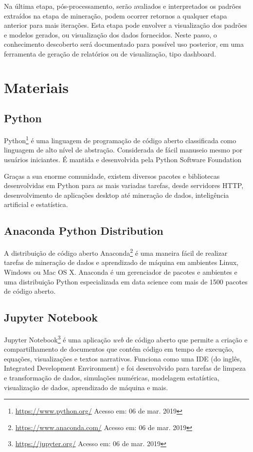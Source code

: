 Na última etapa, pós-processamento, serão avaliados e interpretados os padrões
extraídos na etapa de mineração, podem ocorrer retornos a qualquer etapa
anterior para mais iterações. Esta etapa pode envolver a visualização dos
padrões e modelos gerados, ou visualização dos dados fornecidos. Neste passo, o
conhecimento descoberto será documentado para possível uso posterior, em uma
ferramenta de geração de relatórios ou de visualização, tipo dashboard.

\section{Materiais}

\subsection{Python}

Python\footnote{\url{https://www.python.org/} Acesso em: 06 de mar. 2019} é uma
linguagem de programação de código aberto classificada como linguagem de alto
nível de abstração. Considerada de fácil manuseio mesmo por usuários iniciantes.
É mantida e desenvolvida pela Python Software Foundation

Graças a sua enorme comunidade, existem diversos pacotes e bibliotecas
desenvolvidas em Python para as mais variadas tarefas, desde servidores HTTP,
desenvolvimento de aplicações desktop até mineração de dados, inteligência
artificial e estatística.

\subsection{Anaconda Python Distribution}

A distribuição de código aberto
Anaconda\footnote{\url{https://www.anaconda.com/} Acesso em: 06 de mar. 2019}  é
uma maneira fácil de realizar tarefas de mineração de dados e aprendizado de
máquina em ambientes Linux, Windows ou Mac OS X. Anaconda é um gerenciador de
pacotes e ambientes e uma distribuição Python especializada em data science com
mais de 1500 pacotes de código aberto.

\subsection{Jupyter Notebook}

Jupyter Notebook\footnote{\url{https://jupyter.org/} Acesso em: 06 de mar. 2019}
é uma aplicação \textit{web} de código aberto que permite a criação e
compartilhamento de documentos que contém código em tempo de execução, equações,
visualizações e textos narrativos. Funciona como uma IDE (do inglês, Integrated
Development Environment) e foi desenvolvido para tarefas de limpeza e
transformação de dados, simulações numéricas, modelagem estatística,
visualização de dados, aprendizado de máquina e mais.

